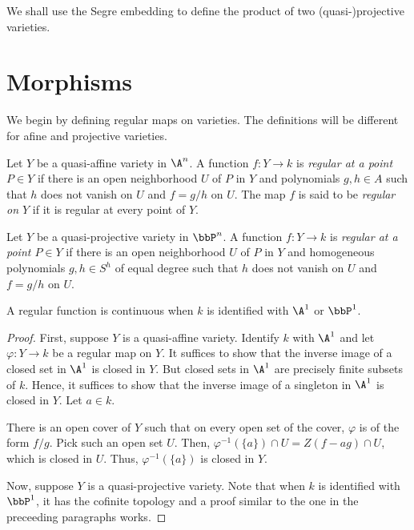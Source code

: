 We shall use the Segre embedding to define the product of two (quasi-)projective varieties.

\section{Morphisms}

We begin by defining regular maps on varieties. The definitions will be different for afine and projective varieties.

\begin{definition}
    Let $Y$ be a quasi-affine variety in $\A^n$. A function $f: Y\to k$ is \emph{regular at a point $P\in Y$} if there is an open neighborhood $U$ of $P$ in $Y$ and polynomials $g,h\in A$ such that $h$ does not vanish on $U$ and $f = g/h$ on $U$. The map $f$ is said to be \emph{regular on $Y$} if it is regular at every point of $Y$.

    Let $Y$ be a quasi-projective variety in $\bbP^n$. A function $f: Y\to k$ is \emph{regular at a point $P\in Y$} if there is an open neighborhood $U$ of $P$ in $Y$ and homogeneous polynomials $g,h\in S^h$ of equal degree such that $h$ does not vanish on $U$ and $f = g/h$ on $U$.
\end{definition}

\begin{theorem}
    A regular function is continuous when $k$ is identified with $\A^1$ or $\bbP^1$.
\end{theorem}
\begin{proof}
    First, suppose $Y$ is a quasi-affine variety. Identify $k$ with $\A^1$ and let $\varphi: Y\to k$ be a regular map on $Y$. It suffices to show that the inverse image of a closed set in $\A^1$ is closed in $Y$. But closed sets in $\A^1$ are precisely finite subsets of $k$. Hence, it suffices to show that the inverse image of a singleton in $\A^1$ is closed in $Y$. Let $a\in k$.

    There is an open cover of $Y$ such that on every open set of the cover, $\varphi$ is of the form $f/g$. Pick such an open set $U$. Then, $\varphi^{-1}(\{a\})\cap U = Z(f - ag)\cap U$, which is closed in $U$. Thus, $\varphi^{-1}(\{a\})$ is closed in $Y$.

    Now, suppose $Y$ is a quasi-projective variety. Note that when $k$ is identified with $\bbP^1$, it has the cofinite topology and a proof similar to the one in the preceeding paragraphs works.
\end{proof}

